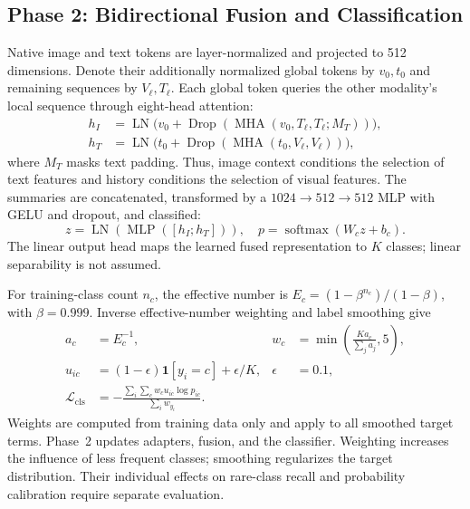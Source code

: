 \documentclass[conference,a4paper]{IEEEtran}
\newcommand{\ind}{\mathbf{1}}
\begin{document}
\subsection{Phase 2: Bidirectional Fusion and Classification}
Native image and text tokens are layer-normalized and projected to 512 dimensions. Denote their additionally normalized global tokens by $v_0,t_0$ and remaining sequences by $V_\ell,T_\ell$. Each global token queries the other modality's local sequence through eight-head attention:
\begin{equation}
\begin{aligned}
h_I&=\operatorname{LN}\big(v_0+\operatorname{Drop}(\operatorname{MHA}(v_0,T_\ell,T_\ell;M_T))\big),\\
h_T&=\operatorname{LN}\big(t_0+\operatorname{Drop}(\operatorname{MHA}(t_0,V_\ell,V_\ell))\big),
\end{aligned}
\label{eq:fusion}
\end{equation}
where $M_T$ masks text padding. Thus, image context conditions the selection of text features and history conditions the selection of visual features. The summaries are concatenated, transformed by a $1024\to512\to512$ MLP with GELU and dropout, and classified:
\begin{equation}
z=\operatorname{LN}(\operatorname{MLP}([h_I;h_T])),\quad
p=\operatorname{softmax}(W_cz+b_c).
\end{equation}
The linear output head maps the learned fused representation to $K$ classes; linear separability is not assumed.

For training-class count $n_c$, the effective number is $E_c=(1-\beta^{n_c})/(1-\beta)$, with $\beta=0.999$. Inverse effective-number weighting and label smoothing give
\begin{equation}
\begin{aligned}
a_c&=E_c^{-1}, &w_c&=\min\left(\frac{Ka_c}{\sum_j a_j},5\right),\\
u_{ic}&=(1-\epsilon)\ind[y_i=c]+\epsilon/K, &\epsilon&=0.1,\\
\mathcal L_{\mathrm{cls}}&=-\frac{\sum_i\sum_c w_cu_{ic}\log p_{ic}}{\sum_i w_{y_i}}.&&
\end{aligned}
\label{eq:loss}
\end{equation}
Weights are computed from training data only and apply to all smoothed target terms. Phase~2 updates adapters, fusion, and the classifier. Weighting increases the influence of less frequent classes; smoothing regularizes the target distribution. Their individual effects on rare-class recall and probability calibration require separate evaluation.
\end{document}
